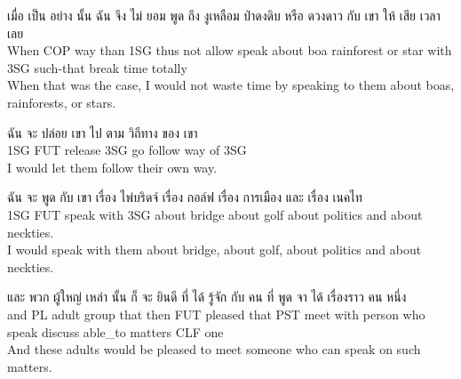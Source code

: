 \documentclass{book}
\begin{document}
	\begin{exe}
		\ex 
		\gll เมื่อ เป็น อย่าง นั้น ฉัน จึง ไม่ ยอม พูด ถึง งูเหลือม ป่าดงดิบ หรือ ดวงดาว กับ เขา ให้ เสีย เวลา เลย\\
		When \textsc{COP} way than \textsc{1SG} thus not allow speak about boa rainforest or star with \textsc{3SG} such-that break time totally\\
		When that was the case, I would not waste time by speaking to them about boas, rainforests, or stars.
	\end{exe}

	\begin{exe}
		\ex 
		\gll ฉัน จะ ปล่อย เขา ไป ตาม วิถีทาง ของ เขา\\
		\textsc{1SG} \textsc{FUT} release \textsc{3SG} go follow way of \textsc{3SG}\\
		I would let them follow their own way.
	\end{exe}

	\begin{exe}
		\ex 
		\gll ฉัน จะ พูด กับ เขา เรื่อง ไพ่บริดจ์ เรื่อง กอล์ฟ เรื่อง การเมือง และ เรื่อง เนคไท\\
		\textsc{1SG} \textsc{FUT} speak with \textsc{3SG} about bridge about golf about politics and about neckties.\\
		I would speak with them about bridge, about golf, about politics and about neckties.
	\end{exe}

	\begin{exe}
		\ex 
		\gll และ พวก ผู้ใหญ่ เหล่า นั้น ก็ จะ ยินดี ที่ ได้ รู้จัก กับ คน ที่ พูด จา ได้ เรื่องราว คน หนึ่ง\\
		and \textsc{PL} adult group that then \textsc{FUT} pleased that \textsc{PST} meet with person who speak discuss able\_to matters \textsc{CLF} one\\
		And these adults would be pleased to meet someone who can speak on such matters.
	\end{exe}
\end{document}

